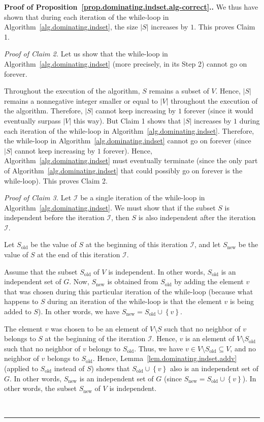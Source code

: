 \documentclass[numbers=enddot,12pt,final,onecolumn,notitlepage]{scrartcl}%
\theoremstyle{definition}
\newenvironment{proof}[1][Proof]{\noindent\textbf{#1.} }{\ \rule{0.5em}{0.5em}}
\newcommand{\set}[1]{\left\{ #1 \right\}}
\newcommand{\abs}[1]{\left| #1 \right|}
\begin{document}
\begin{proof}[Proof of
Proposition~\ref{prop.dominating.indset.alg-correct}.]
We thus have shown that during each iteration of the while-loop in
Algorithm~\ref{alg.dominating.indset}, the size $\abs{S}$ increases
by $1$. This proves Claim 1.

\textit{Proof of Claim 2.} Let us show that the while-loop
in Algorithm~\ref{alg.dominating.indset} (more precisely, in its
Step 2) cannot go on forever.

Throughout the execution of the algorithm, $S$ remains a subset of
$V$. Hence, $\abs{S}$ remains a nonnegative integer smaller or equal
to $\abs{V}$ throughout the execution of the algorithm. Therefore,
$\abs{S}$ cannot keep increasing by $1$ forever (since it would
eventually surpass $\abs{V}$ this way). But Claim 1 shows that
$\abs{S}$ increases by $1$ during each iteration of the while-loop in
Algorithm~\ref{alg.dominating.indset}. Therefore, the while-loop in
Algorithm~\ref{alg.dominating.indset} cannot go on forever (since
$\abs{S}$ cannot keep increasing by $1$ forever). Hence,
Algorithm~\ref{alg.dominating.indset} must eventually terminate (since
the only part of Algorithm~\ref{alg.dominating.indset} that could
possibly go on forever is the while-loop). This proves Claim 2.

\textit{Proof of Claim 3.} Let $\mathcal{I}$ be a single iteration of
the while-loop in Algorithm~\ref{alg.dominating.indset}. We must show
that if the subset $S$ is independent before the iteration
$\mathcal{I}$, then $S$ is also independent after the iteration
$\mathcal{I}$.

Let
$S_{\operatorname{old}}$ be the value of $S$ at the beginning of this
iteration $\mathcal{I}$, and let $S_{\operatorname{new}}$ be the value
of $S$ at the end of this iteration $\mathcal{I}$.

Assume that the subset $S_{\operatorname{old}}$ of $V$ is independent.
In other words, $S_{\operatorname{old}}$ is an independent set of $G$.
Now, $S_{\operatorname{new}}$ is obtained from
$S_{\operatorname{old}}$ by adding the element $v$ that was chosen
during this particular iteration of the while-loop (because what
happens to $S$ during an iteration of the while-loop is that the
element $v$ is being added to $S$). In other words, we have
$S_{\operatorname{new}} = S_{\operatorname{old}} \cup \set{v}$.

The element $v$ was chosen to be an element of $V \setminus S$ such
that no neighbor of $v$ belongs to $S$ at the beginning of the
iteration $\mathcal{I}$. Hence, $v$ is an element of
$V \setminus S_{\operatorname{old}}$ such that no neighbor of $v$
belongs to $S_{\operatorname{old}}$. Thus, we have
$v \in V \setminus S_{\operatorname{old}} \subseteq V$, and no
neighbor of $v$ belongs to $S_{\operatorname{old}}$. Hence,
Lemma~\ref{lem.dominating.indset.addv} (applied to
$S_{\operatorname{old}}$ instead of $S$) shows that
$S_{\operatorname{old}} \cup \set{v}$ also is an independent set of
$G$. In other words, $S_{\operatorname{new}}$ is an independent set of
$G$ (since
$S_{\operatorname{new}} = S_{\operatorname{old}} \cup \set{v}$).
In other words, the subset $S_{\operatorname{new}}$ of $V$ is
independent.


\end{proof}
\end{document}
